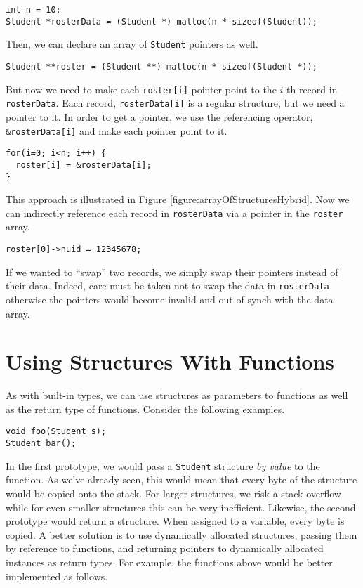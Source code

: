 \begin{verbatim}
int n = 10;
Student *rosterData = (Student *) malloc(n * sizeof(Student));
\end{verbatim}

Then, we can declare an array of \texttt{Student} pointers as well.

\begin{verbatim}
Student **roster = (Student **) malloc(n * sizeof(Student *));
\end{verbatim}

But now we need to make each \texttt{roster[i]} pointer point
to the $i$-th record in \texttt{rosterData}.  Each record, 
\texttt{rosterData[i]} is a regular structure, but we need 
a pointer to it.  In order to get a pointer, we use the referencing
operator, \texttt{&rosterData[i]} and make each pointer point
to it.

\begin{verbatim}
for(i=0; i<n; i++) {
  roster[i] = &rosterData[i];
}
\end{verbatim}

This approach is illustrated in Figure \ref{figure:arrayOfStructuresHybrid}.
Now we can indirectly reference each record in \texttt{rosterData}
via a pointer in the \texttt{roster} array.  

\begin{verbatim}
roster[0]->nuid = 12345678;
\end{verbatim}

If we wanted to ``swap''
two records, we simply swap their pointers instead of their data.  Indeed,
care must be taken not to swap the data in \texttt{rosterData} otherwise
the pointers would become invalid and out-of-synch with the data array.



\section{Using Structures With Functions}

As with built-in types, we can use structures as parameters to functions
as well as the return type of functions.  Consider the following
examples.

\begin{verbatim}
void foo(Student s);
Student bar();
\end{verbatim}

In the first prototype, we would pass a \texttt{Student} structure
\emph{by value} to the function.  As we've already seen, this would
mean that every byte of the structure would be copied onto the stack.
For larger structures, we risk a stack overflow while for even smaller
structures this can be very inefficient.  Likewise, the second prototype
would return a structure.  When assigned to a variable, every byte is
copied.  A better solution is to use dynamically
allocated structures, passing them by reference to functions, and
returning pointers to dynamically allocated instances as return types.
For example, the functions above would be better implemented as follows.

